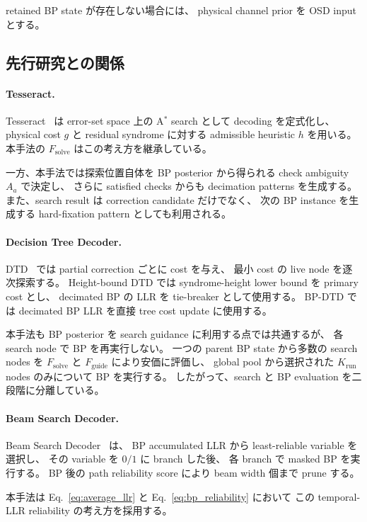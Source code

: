 retained BP state が存在しない場合には、
physical channel prior を OSD input とする。


\subsection{先行研究との関係}

\paragraph{Tesseract.}
Tesseract~\cite{tesseract} は error-set space 上の
A$^\ast$ search として decoding を定式化し、
physical cost $g$ と residual syndrome に対する
admissible heuristic $h$ を用いる。
本手法の $F_{\mathrm{solve}}$ はこの考え方を継承している。

一方、本手法では探索位置自体を BP posterior から得られる
check ambiguity $A_a$ で決定し、
さらに satisfied checks からも decimation patterns を生成する。
また、search result は correction candidate だけでなく、
次の BP instance を生成する hard-fixation pattern としても利用される。


\paragraph{Decision Tree Decoder.}
DTD~\cite{dtd} では partial correction ごとに cost を与え、
最小 cost の live node を逐次探索する。
Height-bound DTD では syndrome-height lower bound を primary cost とし、
decimated BP の LLR を tie-breaker として使用する。
BP-DTD では decimated BP LLR を直接 tree cost update に使用する。

本手法も BP posterior を search guidance に利用する点では共通するが、
各 search node で BP を再実行しない。
一つの parent BP state から多数の search nodes を
$F_{\mathrm{solve}}$ と $F_{\mathrm{guide}}$ により安価に評価し、
global pool から選択された $K_{\mathrm{run}}$ nodes のみについて
BP を実行する。
したがって、search と BP evaluation を二段階に分離している。


\paragraph{Beam Search Decoder.}
Beam Search Decoder~\cite{beamsearch} は、
BP accumulated LLR から least-reliable variable を選択し、
その variable を $0/1$ に branch した後、
各 branch で masked BP を実行する。
BP 後の path reliability score により beam width 個まで prune する。

本手法は
Eq.~\eqref{eq:average_llr} と
Eq.~\eqref{eq:bp_reliability} において
この temporal-LLR reliability の考え方を採用する。

